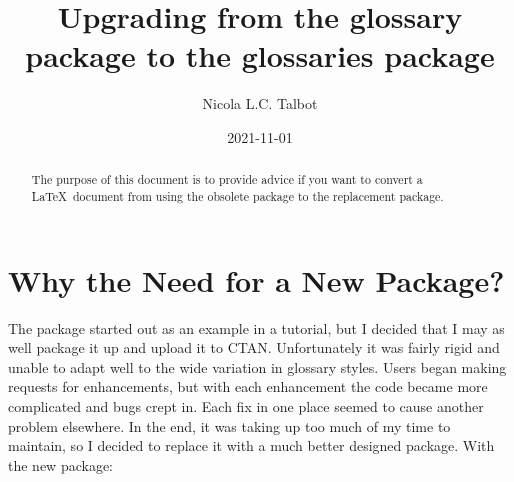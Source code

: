 \documentclass{nlctdoc}
\title{Upgrading from the glossary package to the glossaries
package}
\author{Nicola L.C. Talbot}
\date{2021-11-01}
\begin{document}
\maketitle

\begin{abstract}
The purpose of this document is to provide advice if you want to
convert a \LaTeX\ document from using the obsolete 
package to the replacement  package.
\end{abstract}

\tableofcontents

\section{Why the Need for a New Package?}
\label{whyglossaries}

The  package started out as an example in a tutorial,
but I decided that I may as well package it up and upload it to CTAN.
Unfortunately it was fairly rigid and unable to adapt well to the
wide variation in glossary styles. Users began making requests for
enhancements, but with each enhancement the code became more
complicated and bugs crept in. Each fix in one place seemed to cause
another problem elsewhere. In the end, it was taking up too much
of my time to maintain, so I decided to replace it with a much
better designed package. With the new  package:
\end{document}

